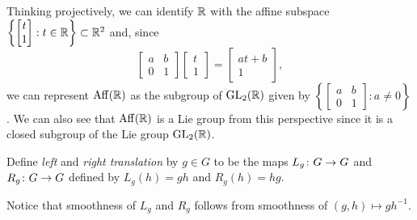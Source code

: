 \begin{example}
	Thinking projectively, we can identify $\mathbb{R}$ with the affine subspace $\left\{ \begin{bmatrix} t \\ 1 \end{bmatrix} : t \in \mathbb{R}\right\} \subset \mathbb{R}^2$ and, since
	\[
		\begin{bmatrix} a & b \\ 0 & 1 \end{bmatrix} \begin{bmatrix} t \\ 1 \end{bmatrix} = \begin{bmatrix} at+b \\ 1 \end{bmatrix},
	\]
	we can represent $\operatorname{Aff}(\mathbb{R})$ as the subgroup of $\operatorname{GL}_2(\mathbb{R})$ given by $\left\{\begin{bmatrix} a & b \\ 0 & 1 \end{bmatrix} : a \neq 0 \right\}$. We can also see that $\operatorname{Aff}(\mathbb{R})$ is a Lie group from this perspective since it is a closed subgroup of the Lie group $\operatorname{GL}_2(\mathbb{R})$.
\end{example}

\begin{definition}\label{def:left and right translation}
	Define \emph{left} and \emph{right translation} by $g \in G$ to be the maps $L_g \colon\thinspace\! G \to G$ and $R_g \colon\thinspace\! G \to G$ defined by $L_g(h) = gh$ and $R_g(h) = hg$.
\end{definition}

Notice that smoothness of $L_g$ and $R_g$ follows from smoothness of $(g,h) \mapsto gh^{-1}$.